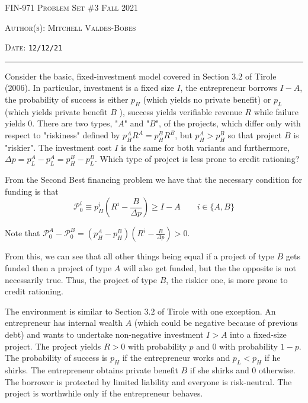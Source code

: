 \documentclass[12pt]{amsart}
\begin{document}
\thispagestyle{empty}


{\scshape FIN-971} \hfill {\scshape \Large Problem Set \#3} \hfill {\scshape Fall 2021}\\
{\scshape Author(s): \hfill Mitchell Valdes-Bobes\\
{\scshape Date: \hfill \texttt{12/12/21}
\medskip

\hrule

\bigskip

\bigskip
    
\begin{exercise}
Consider the basic, fixed-investment model covered in Section $3.2$ of Tirole (2006). 
In particular, investment is a fixed size $I$, the entrepreneur borrows $I-A$, the probability of success is either $p_{H}$ (which
yields no private benefit) or $p_{L}$ (which yields private benefit $B$ ), success yields verifiable revenue $R$ while failure yields 0.
There are two types, "$A$" and "$B$", of the projects, which differ only with respect to "riskiness" defined by $p_{H}^{A} R^{A}=p_{H}^{B} R^{B}$,
but $p_{H}^{A}>p_{H}^{B}$ so that project $B$ is "riskier". The investment cost $I$ is the same for both variants and furthermore,
$\Delta p=p_{L}^{A}-p_{L}^{A}=p_{H}^{B}-p_{L}^{B}$. Which type of project is less prone to credit rationing?
\end{exercise}

\begin{answer}
    From the Second Best financing problem we have that the necessary condition for funding is that 
    $$
    \mathcal{P}_{0}^i  \equiv p^i_{H}\left(R^i-\frac{B}{\Delta p}\right) \geq I-A \qquad i\in\{A,B\}
    $$

    Note that $\mathcal{P}_{0}^A - \mathcal{P}_{0}^B =  (p^A_{H} - p^B_{H}) \left(R^i-\frac{B}{\Delta p}\right)> 0$. 

    From this, we can see that all other things being equal if a project of type $B$ gets funded then a project of type $A$ will also get funded, but the 
    the opposite is not necessarily true.
    Thus, the project of type $B$, the riskier one, is more prone to credit rationing.

\end{answer}

\begin{exercise} 
The environment is similar to Section $3.2$ of Tirole with one exception. An entrepreneur has internal wealth $A$ (which could be
negative because of previous debt) and wants to undertake non-negative investment $I>A$ into a fixed-size project.
The project yields $R>0$ with probability $p$ and 0 with probability $1-p$. The probability of success is $p_{H}$ if the entrepreneur
works and $p_{L}<p_{H}$ if he shirks. The entrepreneur obtains private benefit $B$ if she shirks and 0 otherwise. The borrower is
protected by limited liability and everyone is risk-neutral. The project is worthwhile only if the entrepreneur behaves.


\end{exercise}}}
\end{document}
